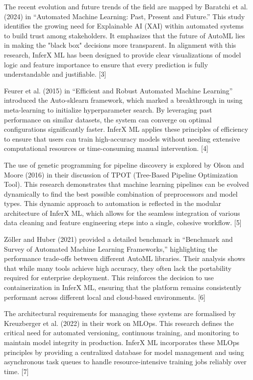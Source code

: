 The recent evolution and future trends of the field are mapped by Baratchi et al. (2024) in ``Automated Machine Learning: Past, Present and Future.'' This study identifies the growing need for Explainable AI (XAI) within automated systems to build trust among stakeholders. It emphasizes that the future of AutoML lies in making the "black box" decisions more transparent. In alignment with this research, InferX ML has been designed to provide clear visualizations of model logic and feature importance to ensure that every prediction is fully understandable and justifiable. [3]\vspace{0.4cm}

Feurer et al. (2015) in ``Efficient and Robust Automated Machine Learning'' introduced the Auto-sklearn framework, which marked a breakthrough in using meta-learning to initialize hyperparameter search. By leveraging past performance on similar datasets, the system can converge on optimal configurations significantly faster. InferX ML applies these principles of efficiency to ensure that users can train high-accuracy models without needing extensive computational resources or time-consuming manual intervention. [4]\vspace{0.4cm}

The use of genetic programming for pipeline discovery is explored by Olson and Moore (2016) in their discussion of TPOT (Tree-Based Pipeline Optimization Tool). This research demonstrates that machine learning pipelines can be evolved dynamically to find the best possible combination of preprocessors and model types. This dynamic approach to automation is reflected in the modular architecture of InferX ML, which allows for the seamless integration of various data cleaning and feature engineering steps into a single, cohesive workflow. [5]\vspace{0.4cm}

Zöller and Huber (2021) provided a detailed benchmark in ``Benchmark and Survey of Automated Machine Learning Frameworks,'' highlighting the performance trade-offs between different AutoML libraries. Their analysis shows that while many tools achieve high accuracy, they often lack the portability required for enterprise deployment. This reinforces the decision to use containerization in InferX ML, ensuring that the platform remains consistently performant across different local and cloud-based environments. [6]\vspace{0.4cm}

The architectural requirements for managing these systems are formalised by Kreuzberger et al. (2022) in their work on MLOps. This research defines the critical need for automated versioning, continuous training, and monitoring to maintain model integrity in production. InferX ML incorporates these MLOps principles by providing a centralized database for model management and using asynchronous task queues to handle resource-intensive training jobs reliably over time. [7]\vspace{0.4cm}


